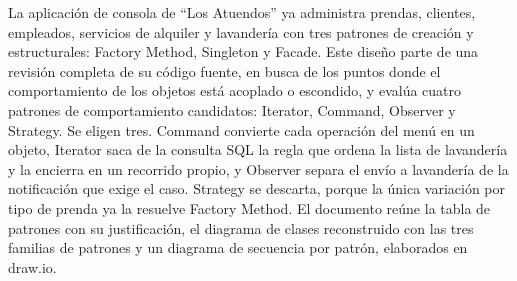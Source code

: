%
%

{}
\begin{center}\textbf{\sectionTitleAbstract}\end{center}

\noindent La aplicación de consola de ``Los Atuendos'' ya administra prendas, clientes, empleados, servicios de alquiler y lavandería con tres patrones de creación y estructurales: Factory Method, Singleton y Facade. Este diseño parte de una revisión completa de su código fuente, en busca de los puntos donde el comportamiento de los objetos está acoplado o escondido, y evalúa cuatro patrones de comportamiento candidatos: Iterator, Command, Observer y Strategy. Se eligen tres. Command convierte cada operación del menú en un objeto, Iterator saca de la consulta SQL la regla que ordena la lista de lavandería y la encierra en un recorrido propio, y Observer separa el envío a lavandería de la notificación que exige el caso. Strategy se descarta, porque la única variación por tipo de prenda ya la resuelve Factory Method. El documento reúne la tabla de patrones con su justificación, el diagrama de clases reconstruido con las tres familias de patrones y un diagrama de secuencia por patrón, elaborados en draw.io.
